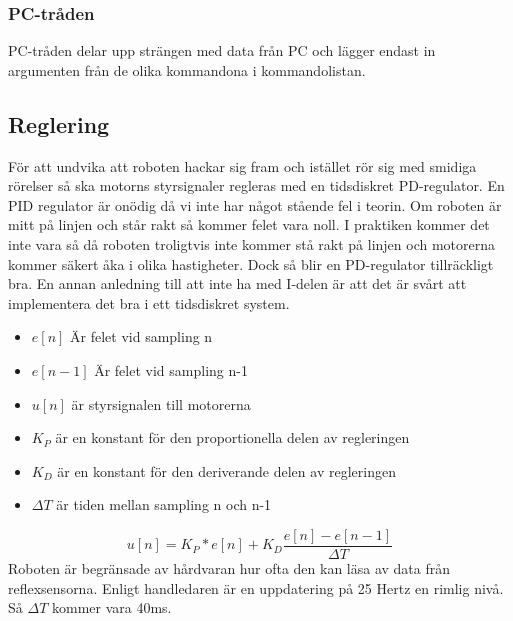 \subsubsection{PC-tråden}
PC-tråden delar upp strängen med data från PC och lägger endast in argumenten från de olika kommandona i kommandolistan.

\subsection{Reglering}
För att undvika att roboten hackar sig fram och istället rör sig med smidiga rörelser så ska motorns styrsignaler regleras med en tidsdiskret PD-regulator. En PID regulator är onödig då vi inte har något stående fel i teorin. Om roboten är mitt på linjen och står rakt så kommer felet vara noll. I praktiken kommer det inte vara så då roboten troligtvis inte kommer stå rakt på linjen och motorerna kommer säkert åka i olika hastigheter. Dock så blir en PD-regulator tillräckligt bra. En annan anledning till att inte ha med I-delen är att det är svårt att implementera det bra i ett tidsdiskret system. 
\begin{itemize}
\item $e[n]$ Är felet vid sampling n
\item $e[n-1]$ Är felet vid sampling n-1
\item $u[n]$ är styrsignalen till motorerna
\item $K_{P}$ är en konstant för den proportionella delen av regleringen
\item $K_{D}$ är en konstant för den deriverande delen av regleringen
\item $\Delta T$ är tiden mellan sampling n och n-1
 
\end{itemize}
 $$ u[n] = K_P*e[n] + K_D\frac{e[n]-e[n-1]}{\Delta T}$$
 Roboten är begränsade av hårdvaran hur ofta den kan läsa av data från reflexsensorna. Enligt handledaren är en uppdatering på 25 Hertz en rimlig nivå. Så $\Delta T$ kommer vara 40ms. 

